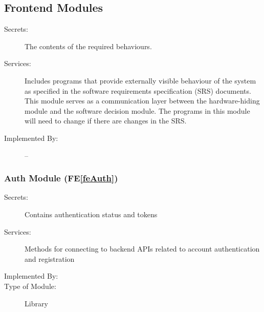 \documentclass[12pt, titlepage]{article}
\newcommand{\feref}[1]{FE\ref{#1}}
\newcommand{\labelfedef}[1]{\label{fe#1def}}
\newcommand{\beref}[1]{BE\ref{#1}}
\newcommand{\labelbedef}[1]{\label{be#1def}}
\begin{document}


\subsection{Frontend Modules}

\begin{description}
\item[Secrets:]The contents of the required behaviours.
\item[Services:]Includes programs that provide externally visible behaviour of
  the system as specified in the software requirements specification (SRS)
  documents. This module serves as a communication layer between the
  hardware-hiding module and the software decision module. The programs in this
  module will need to change if there are changes in the SRS.
\item[Implemented By:] --
\end{description}

\subsubsection{Auth Module (\feref{feAuth}) \labelfedef{Auth}}

\begin{description}
\item[Secrets:]Contains authentication status and tokens
\item[Services:]Methods for connecting to backend APIs related to account authentication and registration
\item[Implemented By:] \progname
\item[Type of Module:] Library
\end{description}
\end{document}
